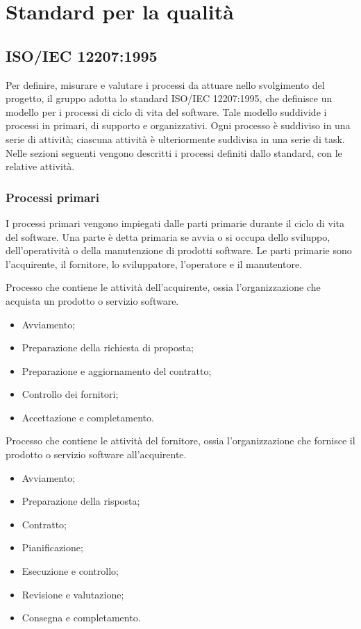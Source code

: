 \section{Standard per la qualità}

\subsection{ISO/IEC 12207:1995}
Per definire, misurare e valutare i processi da attuare nello svolgimento
del progetto, il gruppo adotta lo standard ISO/IEC 12207:1995, che
definisce un modello per i processi di ciclo di vita del software. 
Tale modello suddivide i processi in primari, di supporto e organizzativi.
Ogni processo è suddiviso in una serie di attività; ciascuna attività è 
ulteriormente suddivisa in una serie di task.
Nelle sezioni seguenti vengono descritti i processi definiti dallo standard, 
con le relative attività.

\subsubsection{Processi primari}
I processi primari vengono impiegati dalle parti primarie durante il ciclo di 
vita del software. Una parte è detta primaria se avvia o si occupa dello 
sviluppo, dell'operatività o della manutenzione di prodotti software. 
Le parti primarie sono l'acquirente, il fornitore, lo sviluppatore, l'operatore e il manutentore.

Processo che contiene le attività dell'acquirente, ossia l'organizzazione che
acquista un prodotto o servizio software.
\begin{itemize}
    \item Avviamento;
    \item Preparazione della richiesta di proposta;
    \item Preparazione e aggiornamento del contratto;
    \item Controllo dei fornitori;
    \item Accettazione e completamento.
\end{itemize}

Processo che contiene le attività del fornitore, ossia l'organizzazione che
fornisce il prodotto o servizio software all'acquirente.
\begin{itemize}
    \item Avviamento;
    \item Preparazione della risposta;
    \item Contratto;
    \item Pianificazione;
    \item Esecuzione e controllo;
    \item Revisione e valutazione;
    \item Consegna e completamento.
\end{itemize}


